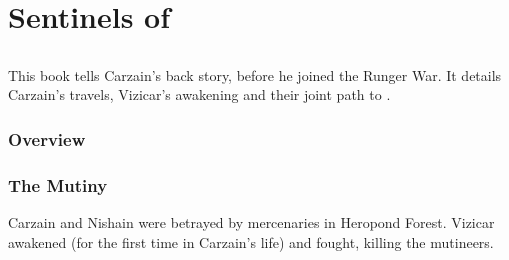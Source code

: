 
\begin{comment}
\part{The Book Series of \Miith}
\end{comment}
\begin{comment}
% 
% 
% 
% 
% 
% 
% 
\end{comment}



\part{Sentinels of \Miith}























\chapter{\CarzainPrequelBook}
This book tells Carzain's back story, before he joined the Runger War. 
It details Carzain's travels, Vizicar's awakening and their joint path to \kenosis. 















\section{Overview}















\section{The Mutiny}
Carzain and Nishain were betrayed by mercenaries in Heropond Forest. 
Vizicar awakened (for the first time in Carzain's life) and fought, killing the mutineers. 









